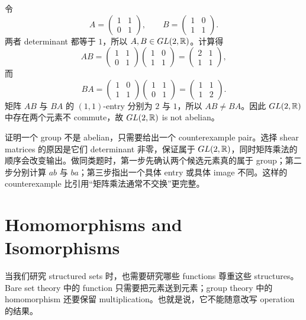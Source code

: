 \begin{solution}
令
\[
  A=\begin{pmatrix}1&1\\0&1\end{pmatrix},
  \qquad
  B=\begin{pmatrix}1&0\\1&1\end{pmatrix}.
\]
两者 determinant 都等于 \(1\)，所以 \(A,B\in GL(2,\mathbb{R})\)。计算得
\[
  AB=
  \begin{pmatrix}1&1\\0&1\end{pmatrix}
  \begin{pmatrix}1&0\\1&1\end{pmatrix}
  =
  \begin{pmatrix}2&1\\1&1\end{pmatrix},
\]
而
\[
  BA=
  \begin{pmatrix}1&0\\1&1\end{pmatrix}
  \begin{pmatrix}1&1\\0&1\end{pmatrix}
  =
  \begin{pmatrix}1&1\\1&2\end{pmatrix}.
\]
矩阵 \(AB\) 与 \(BA\) 的 \((1,1)\)-entry 分别为 \(2\) 与 \(1\)，所以 \(AB\neq BA\)。因此 \(GL(2,\mathbb{R})\) 中存在两个元素不 commute，故 \(GL(2,\mathbb{R})\) is not abelian。
\end{solution}

\begin{explanation}
证明一个 group 不是 abelian，只需要给出一个 counterexample pair。选择 shear matrices 的原因是它们 determinant 非零，保证属于 \(GL(2,\mathbb{R})\)，同时矩阵乘法的顺序会改变输出。做同类题时，第一步先确认两个候选元素真的属于 group；第二步分别计算 \(ab\) 与 \(ba\)；第三步指出一个具体 entry 或具体 image 不同。这样的 counterexample 比引用“矩阵乘法通常不交换”更完整。
\end{explanation}

\section{Homomorphisms and Isomorphisms}

当我们研究 structured sets 时，也需要研究哪些 functions 尊重这些 structures。Bare set theory 中的 function 只需要把元素送到元素；group theory 中的 homomorphism 还要保留 multiplication。也就是说，它不能随意改写 operation 的结果。

